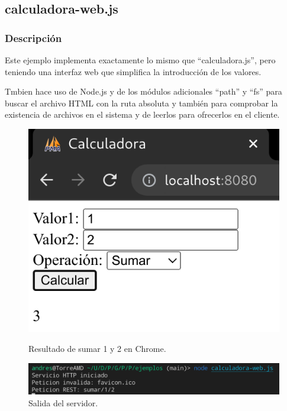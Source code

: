 \documentclass{article}
\begin{document}
\subsection{calculadora-web.js}
\subsubsection{Descripción}
Este ejemplo implementa exactamente lo mismo que ``calculadora.js'', pero teniendo una interfaz web que simplifica la introducción de los valores.

Tmbien hace uso de Node.js y de los módulos adicionales ``path'' y ``fs'' para buscar el archivo HTML con la ruta absoluta y también para comprobar la existencia de archivos en el sistema y de leerlos para ofrecerlos en el cliente.

\begin{figure}[H]
    \centering
    \begin{minipage}[H]{0.49\textwidth}
        \centering
        \includegraphics[width=\textwidth]{images/cwebsuma.png}
        \caption{Resultado de sumar 1 y 2 en Chrome.}
    \end{minipage}
    \hfill
    \begin{minipage}[H]{0.49\textwidth}
        \centering
        \includegraphics[width=\textwidth]{images/cwebsumaserver.png}
        \caption{Salida del servidor.}
    \end{minipage}
\end{figure}
\end{document}
